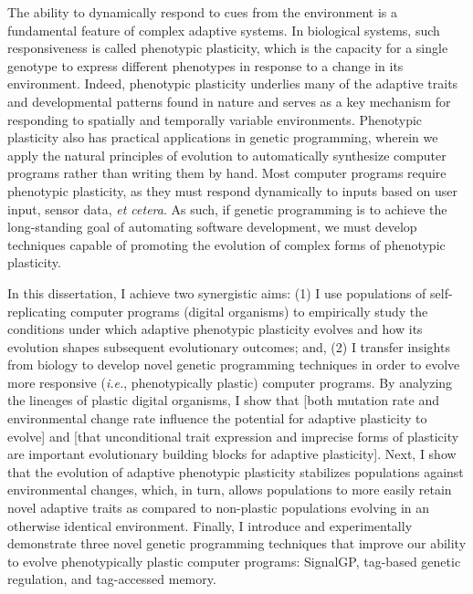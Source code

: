 


The ability to dynamically respond to cues from the environment is a fundamental feature of complex adaptive systems.
In biological systems, such responsiveness is called phenotypic plasticity, which is the capacity for a single genotype to express different phenotypes in response to a change in its environment.
Indeed, phenotypic plasticity underlies many of the adaptive traits and developmental patterns found in nature and serves as a key mechanism for responding to spatially and temporally variable environments.
Phenotypic plasticity also has practical applications in genetic programming, wherein we apply the natural principles of evolution to automatically synthesize computer programs rather than writing them by hand.
Most computer programs require phenotypic plasticity, as they must respond dynamically to inputs based on user input, sensor data, \textit{et cetera}. %
As such, if genetic programming is to achieve the long-standing goal of automating software development, we must develop techniques capable of promoting the evolution of complex forms of phenotypic plasticity.

In this dissertation, I achieve two synergistic aims: (1) I use populations of self-replicating computer programs (digital organisms) to empirically study the conditions under which adaptive phenotypic plasticity evolves and how its evolution shapes subsequent evolutionary outcomes; and, (2) I transfer insights from biology to develop novel genetic programming techniques in order to evolve more responsive (\textit{i.e.}, phenotypically plastic) computer programs. %
By analyzing the lineages of plastic digital organisms, I show that [both mutation rate and environmental change rate influence the potential for adaptive plasticity to evolve] and [that unconditional trait expression and imprecise forms of plasticity are important evolutionary building blocks for adaptive plasticity]. 
Next, I show that the evolution of adaptive phenotypic plasticity stabilizes populations against environmental changes, which, in turn, allows populations to more easily retain novel adaptive traits as compared to non-plastic populations evolving in an otherwise identical environment. 
Finally, I introduce and experimentally demonstrate three novel genetic programming techniques that improve our ability to evolve phenotypically plastic computer programs: SignalGP, tag-based genetic regulation, and tag-accessed memory.







